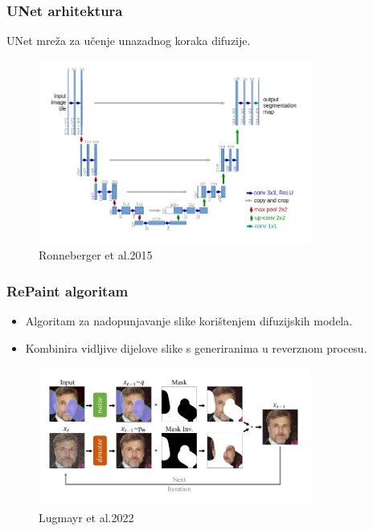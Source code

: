 \documentclass{beamer}
\begin{document}
\begin{frame}
    \frametitle{UNet arhitektura}
    \begin{itemize}
        UNet mreža za učenje unazadnog koraka difuzije.
    \end{itemize}
    \center
    \begin{figure}
        \includegraphics[width=0.8\textwidth]{images/unet.png}
        \caption{Ronneberger et al.2015}
    \end{figure}
\end{frame}

\begin{frame}
    \frametitle{RePaint algoritam}
    \begin{itemize}
        \item Algoritam za nadopunjavanje slike korištenjem difuzijskih modela.
        \pause
        \item Kombinira vidljive dijelove slike s generiranima u reverznom procesu.
    \end{itemize}
    \pause
    \center
    \begin{figure}
        \includegraphics[width=0.8\textwidth]{images/repaint.png}
        \caption{Lugmayr et al.2022}
    \end{figure}
\end{frame}
\end{document}
